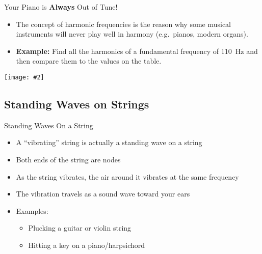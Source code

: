 \documentclass[12pt,compress,aspectratio=169]{beamer}
\newcommand{\pic}[2]{\texttt{[image: \#2]}}
\begin{document}
\begin{frame}{Your Piano is \textbf{Always} Out of Tune!}
  \begin{itemize}
  \item The concept of harmonic frequencies is the reason why some musical
    instruments will never play well in harmony (e.g.\ pianos, modern organs).
  \item \textbf{Example:} Find all the harmonics of a fundamental frequency of
    \SI{110}{\hertz} and then compare them to the values on the table.
  \end{itemize}
  \begin{center}
    \pic{.6}{fundamental_freqs.png}
  \end{center}
\end{frame}



\subsection[Strings]{Standing Waves on Strings}

\begin{frame}{Standing Waves On a String}
  \begin{itemize}
  \item A ``vibrating'' string is actually a standing wave on a string
  \item Both ends of the string are nodes
  \item As the string vibrates, the air around it vibrates at the same frequency
  \item The vibration travels as a sound wave toward your ears
  \item Examples:
    \begin{itemize}
    \item Plucking a guitar or violin string
    \item Hitting a key on a piano/harpsichord
    \end{itemize}
  \end{itemize}

\end{frame}
\end{document}
